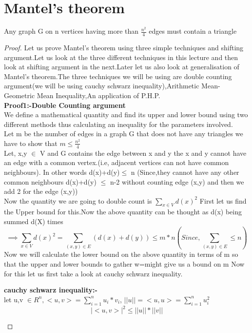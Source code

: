 \section{Mantel's theorem}
\begin{theorem}
Any graph G on n vertices having more than $\frac{n^2}{4}$ edges must contain a triangle
\end{theorem}
\begin{proof}
Let us prove Mantel's theorem using three simple techniques and shifting argument.Let us look at the three different techniques in this lecture and then look at shifting argument in the next.Later let us also look at generalisation of Mantel's theorem.The three techniques  we will be using are double counting argument(we will be using cauchy schwarz inequality),Arithmetic Mean-Geometric Mean Inequality,An application of P.H.P.\\
\textbf{Proof1:-Double Counting argument}\\
We define a mathematical quantity and find its upper and lower bound using two different methods thus calculating an inequality for the parameters involved.\\
Let m be the number of edges in a graph G that does not have any triangles we have to show that $m \le \frac{n^2}{4}$\\
Let, x,y $\in$ V and G contains the edge between x and y the x and y cannot have an edge with a common vertex.(i.e, adjacent vertices can not have common neighbours).
In other words d(x)+d(y)$\le$ n (Since,they cannot have any other common neighbours d(x)+d(y) $\leq$ n-2 without counting edge (x,y) and then we add 2 for the edge (x,y))\\
Now the quantity we are going to double count is $\sum_{x \in V} d(x)^2$
First let us find the Upper bound for this.Now the above quantity can be thought as d(x) being summed d(X) times\\
$$\implies \sum_{x \in V}d(x)^2=\sum_{(x,y) \in E}(d(x)+d(y)) \leq m*n(Since,\sum_{(x,y)\in E} \leq n)$$
Now we will calculate the lower bound on the above quantity in terms of m so that the upper and lower bounds to gather w=might give us a bound on m
Now for this let us first take a look at cauchy schwarz inequality.\\
\begin{theorem}
\textbf{cauchy schwarz inequality:-}\\
let u,v $\in R^n, $$< u,v >=\sum_{i=1}^n
u_i*v_i$, $||u||=< u,u >=\sum_{i=1}^n u_i^2$\\
$$|< u,v >|^2 \leq ||u||*||v||$$
$$
\end{theorem}
\end{proof}

